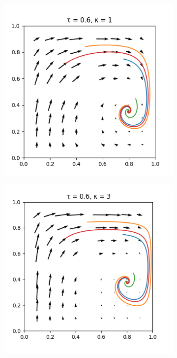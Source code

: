 \documentclass[10pt,a4paper]{article}
\begin{document}
\begin{figure}[h]
    \centering
    \begin{subfigure}[b]{0.30\textwidth}
        \includegraphics[width=\textwidth]{Figures/boltzmann_mp_1.png}
    \end{subfigure}
    \begin{subfigure}[b]{0.30\textwidth}
        \includegraphics[width=\textwidth]{Figures/boltzmann_mp_3.png}

\end{subfigure}
\end{figure}
\end{document}
